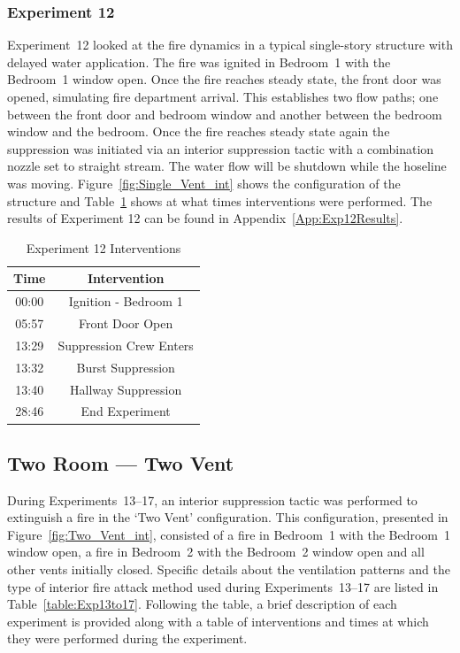 \documentclass[12pt,oneside]{book}
\begin{document}
\subsubsection{Experiment 12}
Experiment~12 looked at the fire dynamics in a typical single-story structure with delayed water application. The fire was ignited in Bedroom~1 with the Bedroom~1 window open. Once the fire reaches steady state, the front door was opened, simulating fire department arrival. This establishes two flow paths; one between the front door and bedroom window and another between the bedroom window and the bedroom. Once the fire reaches steady state again the suppression was initiated via an interior suppression tactic with a combination nozzle set to straight stream. The water flow will be shutdown while the hoseline was moving.  Figure~\ref{fig:Single_Vent_int} shows the configuration of the structure and Table~\ref{Table:Exp12Interventions} shows at what times interventions were performed. The results of Experiment 12 can be found in Appendix~\ref{App:Exp12Results}. 

\begin{table}[H]
	\centering
	\caption{Experiment 12 Interventions}
	\begin{tabular}{|c|c|} 
		\hline
		Time & Intervention \\ \hline \hline
		00:00 & Ignition - Bedroom 1 \\ \hline
		05:57 & Front Door Open \\ \hline
		13:29 & Suppression Crew Enters\\ \hline
		13:32 & Burst Suppression \\ \hline 
		13:40 & Hallway Suppression \\ \hline
		28:46 & End Experiment\\ \hline
	\end{tabular}
	\label{Table:Exp12Interventions}
\end{table}

\clearpage

\subsection{Two Room --- Two Vent}

During Experiments~13--17, an interior suppression tactic was performed to extinguish a fire in the `Two Vent' configuration. This configuration, presented in Figure~\ref{fig:Two_Vent_int}, consisted of a fire in Bedroom~1 with the Bedroom~1 window open, a fire in Bedroom~2 with the Bedroom~2 window open and all other vents initially closed. Specific details about the ventilation patterns and the type of interior fire attack method used during Experiments~13--17 are listed in Table~\ref{table:Exp13to17}. Following the table, a brief description of each experiment is provided along with a table of interventions and times at which they were performed during the experiment. 
\end{document}
